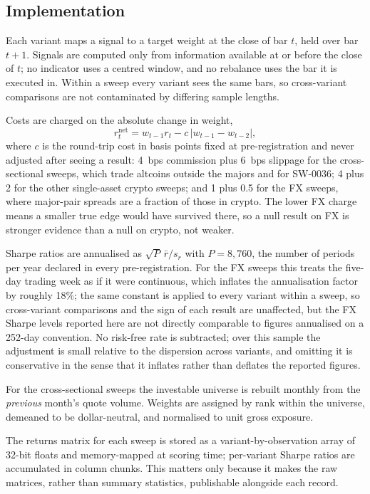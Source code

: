 \documentclass[11pt,a4paper]{article}
\begin{document}
\subsection{Implementation}

Each variant maps a signal to a target weight at the close of bar $t$, held
over bar $t+1$. Signals are computed only from information available at or
before the close of $t$; no indicator uses a centred window, and no
rebalance uses the bar it is executed in. Within a sweep every variant sees
the same bars, so cross-variant comparisons are not contaminated by differing
sample lengths.

Costs are charged on the absolute change in weight,
\begin{equation*}
r_t^{\text{net}} = w_{t-1} r_t - c\,\lvert w_{t-1} - w_{t-2} \rvert ,
\end{equation*}
where $c$ is the round-trip cost in basis points fixed at pre-registration
and never adjusted after seeing a result: 4~bps commission plus 6~bps
slippage for the cross-sectional sweeps, which trade altcoins outside the
majors and for SW-0036; 4 plus 2 for the other single-asset crypto sweeps;
and 1 plus 0.5 for the
FX sweeps, where major-pair spreads are a fraction of those in crypto. The
lower FX charge means a smaller true edge would have survived there, so a
null result on FX is stronger evidence than a null on crypto, not weaker.

Sharpe ratios are annualised as $\sqrt{P}\,\bar r / s_r$ with $P = 8{,}760$,
the number of periods per year declared in every pre-registration. For the FX
sweeps this treats the five-day trading week as if it were continuous, which
inflates the annualisation factor by roughly 18\%; the same constant is
applied to every variant within a sweep, so cross-variant comparisons and the
sign of each result are unaffected, but the FX Sharpe levels reported here are
not directly comparable to figures annualised on a 252-day convention. No risk-free
rate is subtracted; over this sample the adjustment is small relative to the
dispersion across variants, and omitting it is conservative in the sense that
it inflates rather than deflates the reported figures.

For the cross-sectional sweeps the investable universe is rebuilt monthly
from the \emph{previous} month's quote volume. Weights are assigned by rank
within the universe, demeaned to be dollar-neutral, and normalised to unit
gross exposure.

The returns matrix for each sweep is stored as a variant-by-observation array
of 32-bit floats and memory-mapped at scoring time; per-variant Sharpe ratios
are accumulated in column chunks. This matters only because it makes the raw
matrices, rather than summary statistics, publishable alongside each record.
\end{document}

